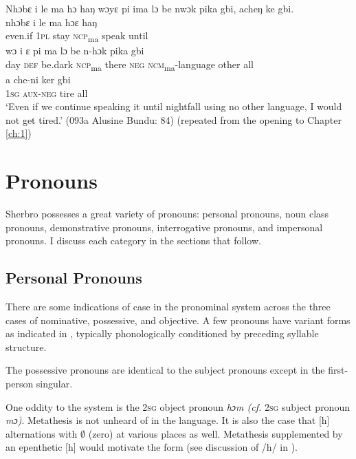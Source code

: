     \ex Nhɔbɛ i le ma hɔ haŋ wɔyɛ pi ima lɔ be nwɔk pika gbi, acheŋ ke gbi.\\
    \gll nhɔbɛ    i    le    ma    hɔɛ    haŋ\\
      even.if  \textsc{1pl}  stay  \textsc{ncp}\textsubscript{ma}    speak    until\\
    \gll wɔ  i  ɛ    pi    ma    lɔ      be    n-hɔk          pika  gbi\\
      day  \textsc{def}  be.dark  \textsc{ncp}\textsubscript{ma}    there    \textsc{neg}  \textsc{ncm}\textsubscript{ma}{}-language  other  all\\
    \gll a  che-ni    ker  gbi\\
    1\textsc{sg}  \textsc{aux-neg}  tire  all\\
\glt ‘Even if we continue speaking it until nightfall using no other language, I would not get tired.' (093a Alusine Bundu: 84) (repeated from the opening to Chapter \ref{ch:1})
\z
\z

\section{Pronouns}
\label{sec:3.3}\hypertarget{Toc115517762}{}
Sherbro possesses a great variety of pronouns: personal pronouns, noun class pronouns, demonstrative pronouns, interrogative pronouns, and impersonal pronouns. I discuss each category in the sections that follow. 

\subsection{Personal Pronouns}
\label{sec:3.3.1}\hypertarget{Toc115517763}{}

There are some indications of case in the pronominal system across the three cases of nominative, possessive, and objective. A few pronouns have variant forms as indicated in , typically phonologically conditioned by preceding syllable structure.

The possessive pronouns are identical to the subject pronouns except in the first-person singular.

One oddity to the system is the \textsc{2sg} object pronoun \textit{hɔm (cf.} 2\textsc{sg} subject pronoun \textit{mɔ)}. Metathesis is not unheard of in the language. It is also the case that [h] alternations with $\emptyset$ (zero) at various places as well. Metathesis supplemented by an epenthetic [h] would motivate the form (see discussion of /h/ in ).

